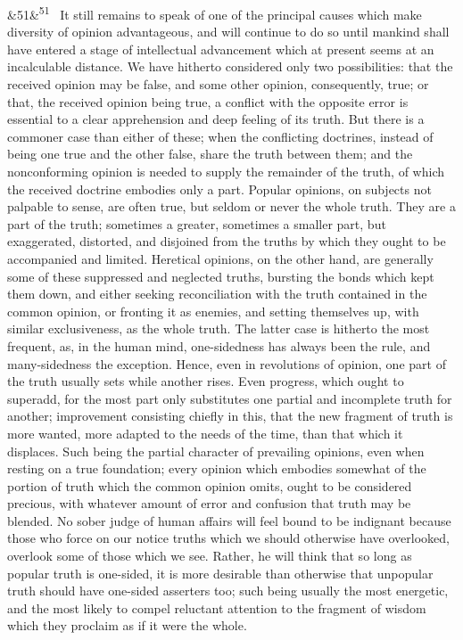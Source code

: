 \documentclass[12pt]{article}
\newcommand{\para}[1][]{\par\noindent\ifx&#1&\else\textsuperscript{\footnotesize #1}~\fi}
\begin{document}
\para[51] It still remains to speak of one of the principal causes which make diversity of opinion advantageous, and will continue to do so until mankind shall have entered a stage of intellectual advancement which at present seems at an incalculable distance. We have hitherto considered only two possibilities: that the received opinion may be false, and some other opinion, consequently, true; or that, the received opinion being true, a conflict with the opposite error is essential to a clear apprehension and deep feeling of its truth. But there is a commoner case than either of these; when the conflicting doctrines, instead of being one true and the other false, share the truth between them; and the nonconforming opinion is needed to supply the remainder of the truth, of which the received doctrine embodies only a part. Popular opinions, on subjects not palpable to sense, are often true, but seldom or never the whole truth. They are a part of the truth; sometimes a greater, sometimes a smaller part, but exaggerated, distorted, and disjoined from the truths by which they ought to be accompanied and limited. Heretical opinions, on the other hand, are generally some of these suppressed and neglected truths, bursting the bonds which kept them down, and either seeking reconciliation with the truth contained in the common opinion, or fronting it as enemies, and setting themselves up, with similar exclusiveness, as the whole truth. The latter case is hitherto the most frequent, as, in the human mind, one-sidedness has always been the rule, and many-sidedness the exception. Hence, even in revolutions of opinion, one part of the truth usually sets while another rises. Even progress, which ought to superadd, for the most part only substitutes one partial and incomplete truth for another; improvement consisting chiefly in this, that the new fragment of truth is more wanted, more adapted to the needs of the time, than that which it displaces. Such being the partial character of prevailing opinions, even when resting on a true foundation; every opinion which embodies somewhat of the portion of truth which the common opinion omits, ought to be considered precious, with whatever amount of error and confusion that truth may be blended. No sober judge of human affairs will feel bound to be indignant because those who force on our notice truths which we should otherwise have overlooked, overlook some of those which we see. Rather, he will think that so long as popular truth is one-sided, it is more desirable than otherwise that unpopular truth should have one-sided asserters too; such being usually the most energetic, and the most likely to compel reluctant attention to the fragment of wisdom which they proclaim as if it were the whole.
\end{document}
